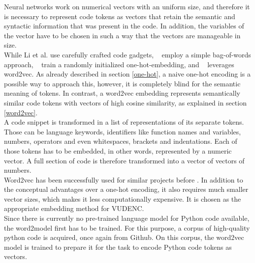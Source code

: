 \documentclass[
	a4paper,
	pagesize,
	pdftex,
	12pt,
	twoside, %
	BCOR=5mm, %
	ngerman,
	fleqn,
	final,
	]{scrartcl}
\begin{document}
Neural networks work on numerical vectors with an uniform size, and therefore it is necessary to represent code tokens as vectors that retain the semantic and syntactic information that was present in the code. In addition, the variables of the vector have to be chosen in such a way that the vectors are manageable in size.\\
While Li et al.\cite{Li.2018} use carefully crafted code gadgets, ~\cite{Hovsepyan.2012} employ a simple bag-of-words approach, ~\cite{Russell.2018} train a randomly initialized one-hot-embedding, and ~\cite{Liu.2018} leverages word2vec. As already described in section \ref{one-hot}, a naive one-hot encoding is a possible way to approach this, however, it is completely blind for the semantic meaning of tokens. In contrast, a word2vec embedding represents semantically similar code tokens with vectors of high cosine similarity, as explained in section \ref{word2vec}.\\
A code snippet is transformed in a list of representations of its separate tokens. Those can be language keywords, identifiers like function names and variables, numbers, operators and even whitespaces, brackets and indentations. Each of those tokens has to be embedded, in other words, represented by a numeric vector. A full section of code is therefore transformed into a vector of vectors of numbers.\\
Word2vec has been successfully used for similar projects before \cite{Liu.2018}. In addition to the conceptual advantages over a one-hot encoding, it also requires much smaller vector sizes, which makes it less computationally expensive. It is chosen as the appropriate embedding method for VUDENC.\\
Since there is currently no pre-trained language model for Python code available, the word2model first has to be trained. For this purpose, a corpus of high-quality python code is acquired, once again from Github. On this corpus, the word2vec model is trained to prepare it for the task to encode Python code tokens as vectors.
\end{document}
